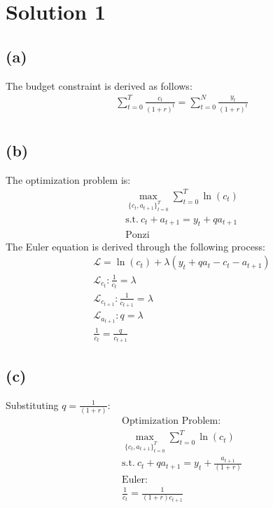 \documentclass[10pt,a4paper]{article}
\newcommand{\sumt}{\sum\limits_{t=0}^{T}}
\newcommand{\sumn}{\sum\limits_{t=0}^{N}}
\begin{document}
\section*{Solution 1}
    \subsection*{(a)}
        The budget constraint is derived as follows:
        \begin{gather*}
            \sumt \frac{c_t}{(1+r)^t} = \sumn \frac{y_t}{(1+r)^t} \\
        \end{gather*}
    \subsection*{(b)}
        The optimization problem is:
        \begin{gather*}
            \max_{\{c_t,a_{t+1}\}_{t=0}^{T}}\sumt\ln(c_t) \\
            \text{s.t.} \ c_t + a_{t+1} = y_t + qa_{t+1} \\
            \text{Ponzi}
        \end{gather*}
        The Euler equation is derived through the following process:
        \begin{gather*}
            \mathcal{L} = \ln(c_t) + \lambda(y_t + qa_t - c_t - a_{t+1}) \\
            \mathcal{L}_{c_t}: \frac{1}{c_t} = \lambda \\
            \mathcal{L}_{c_{t+1}}: \frac{1}{c_{t+1}} = \lambda \\
            \mathcal{L}_{a_{t+1}}: q = \lambda \\
            \frac{1}{c_t} = \frac{q}{c_{t+1}}
        \end{gather*}       
    \subsection*{(c)}
        Substituting $q = \frac{1}{(1+r)}$:
        \begin{gather*}
            \text{Optimization Problem:} \\
            \max_{\{c_t,a_{t+1}\}_{t=0}^{T}}\sumt\ln(c_t) \\
            \text{s.t.} \ c_t + qa_{t+1} = y_t + \frac{a_{t+1}}{(1+r)} \\
            \text{Euler:} \\
            \frac{1}{c_t} = \frac{1}{(1+r)c_{t+1}}
        \end{gather*}
\end{document}
